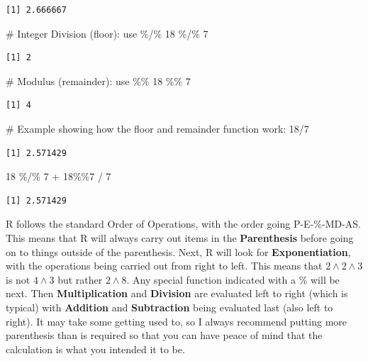 \documentclass[
  letterpaper,
  DIV=11,
  numbers=noendperiod]{scrreprt}
\newenvironment{Shaded}{\begin{snugshade}}{\end{snugshade}}
\newcommand{\CommentTok}[1]{\textcolor[rgb]{0.37,0.37,0.37}{#1}}
\newcommand{\DecValTok}[1]{\textcolor[rgb]{0.68,0.00,0.00}{#1}}
\newcommand{\SpecialCharTok}[1]{\textcolor[rgb]{0.37,0.37,0.37}{#1}}
\begin{document}
\begin{verbatim}
[1] 2.666667
\end{verbatim}

\begin{Shaded}
\begin{Highlighting}[]
\CommentTok{\# Integer Division (floor): use \%/\%}
\DecValTok{18} \SpecialCharTok{\%/\%} \DecValTok{7}
\end{Highlighting}
\end{Shaded}

\begin{verbatim}
[1] 2
\end{verbatim}

\begin{Shaded}
\begin{Highlighting}[]
\CommentTok{\# Modulus (remainder): use \%\%}
\DecValTok{18} \SpecialCharTok{\%\%} \DecValTok{7}
\end{Highlighting}
\end{Shaded}

\begin{verbatim}
[1] 4
\end{verbatim}

\begin{Shaded}
\begin{Highlighting}[]
\CommentTok{\# Example showing how the floor and remainder function work:}
\DecValTok{18}\SpecialCharTok{/}\DecValTok{7}
\end{Highlighting}
\end{Shaded}

\begin{verbatim}
[1] 2.571429
\end{verbatim}

\begin{Shaded}
\begin{Highlighting}[]
\DecValTok{18} \SpecialCharTok{\%/\%} \DecValTok{7} \SpecialCharTok{+} \DecValTok{18}\SpecialCharTok{\%\%}\DecValTok{7} \SpecialCharTok{/} \DecValTok{7}
\end{Highlighting}
\end{Shaded}

\begin{verbatim}
[1] 2.571429
\end{verbatim}

R follows the standard Order of Operations, with the order going
P-E-\%-MD-AS. This means that R will always carry out items in the
\textbf{Parenthesis} before going on to things outside of the
parenthesis. Next, R will look for \textbf{Exponentiation}, with the
operations being carried out from right to left. This means that
\(2 \wedge 2 \wedge 3\) is not \(4 \wedge 3\) but rather \(2\wedge8\).
Any special function indicated with a \% will be next. Then
\textbf{Multiplication} and \textbf{Division} are evaluated left to
right (which is typical) with \textbf{Addition} and \textbf{Subtraction}
being evaluated last (also left to right). It may take some getting used
to, so I always recommend putting more parenthesis than is required so
that you can have peace of mind that the calculation is what you
intended it to be.
\end{document}
